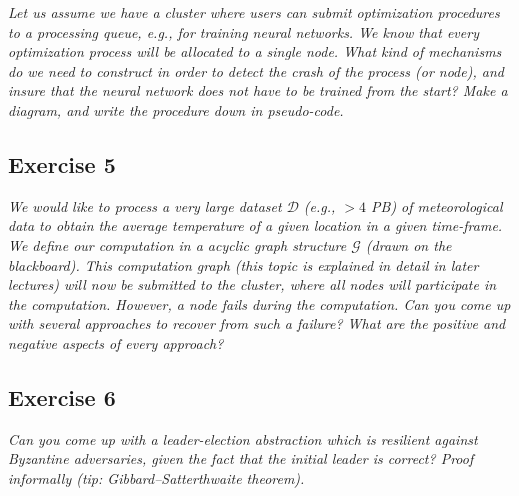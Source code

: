 \emph{Let us assume we have a cluster where users can submit optimization procedures to a processing queue, e.g., for training neural networks. We know that every optimization process will be allocated to a single node. What kind of mechanisms do we need to construct in order to detect the crash of the process (or node), and insure that the neural network does not have to be trained from the start? Make a diagram, and write the procedure down in pseudo-code.}

\subsection*{Exercise 5}
\label{sec:exercise_5}

\emph{We would like to process a very large dataset $\mathcal{D}$ (e.g., $> 4$ PB) of meteorological data to obtain the average temperature of a given location in a given time-frame. We define our computation in a acyclic graph structure $\mathcal{G}$ (drawn on the blackboard). This computation graph (this topic is explained in detail in later lectures) will now be submitted to the cluster, where all nodes will participate in the computation. However, a node fails during the computation. Can you come up with several approaches to recover from such a failure? What are the positive and negative aspects of every approach?}

\subsection*{Exercise 6}
\label{sec:exercise_6}

\emph{Can you come up with a leader-election abstraction which is resilient against Byzantine adversaries, given the fact that the initial leader is correct? Proof informally (tip: Gibbard–Satterthwaite theorem).}


